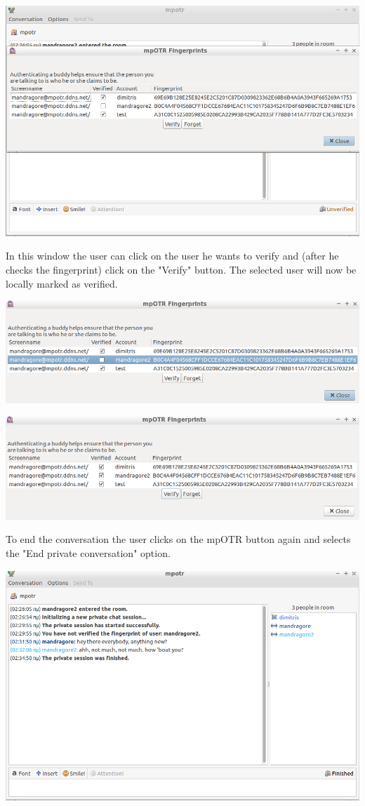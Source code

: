 \documentclass[]{article}
\begin{document}
\includegraphics[scale=0.4]{verification_ui_opened_unverified.png}

In this window the user can click on the user he wants to verify and (after he checks the fingerprint) click on the "Verify" button.
The selected user will now be locally marked as verified.

\includegraphics[scale=0.4]{verification_ui_selected_user_unverified.png}

\includegraphics[scale=0.4]{user_verified_unverified.png}

To end the conversation the user clicks on the mpOTR button again and selects the "End private conversation" option.

\includegraphics[scale=0.4]{finished_unverified.png}
\end{document}
